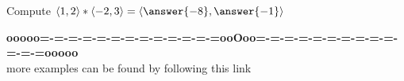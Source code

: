 \documentclass{ximera}
\begin{document}
\begin{question} 


Compute  $\langle 1, 2 \rangle  * \langle -2, 3 \rangle = \left\langle \answer{-8}, \answer{-1} \right\rangle $



\end{question}











\begin{center}
\textbf{\textcolor{green!50!black}{ooooo=-=-=-=-=-=-=-=-=-=-=-=-=ooOoo=-=-=-=-=-=-=-=-=-=-=-=-=ooooo}} \\

more examples can be found by following this link\\ 

\end{center}
\end{document}
